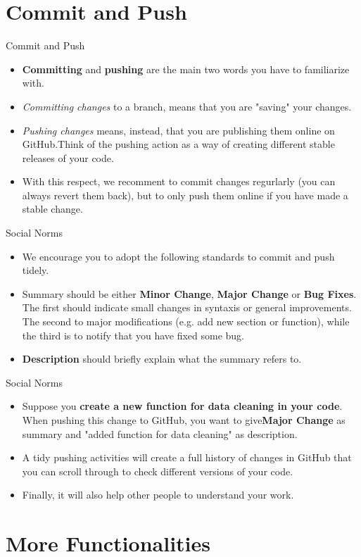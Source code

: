 \documentclass[aspectratio=169]{beamer}
\begin{document}
\section{Commit and Push}

\begin{frame}{Commit and Push}
	\begin{itemize}\setlength\itemsep{1.5em}
		\item \textbf{Committing} and \textbf{pushing} are the main two words you have to familiarize with.
		\item \emph{Committing changes} to a branch, means that you are "saving" your changes.
		\item \emph{Pushing changes} means, instead, that you are publishing them online on GitHub.Think of the pushing action as a way of creating different stable releases of your code.\item With this respect, we recomment to commit changes regurlarly (you can always revert them back), but to only push them online if you have made a stable change. 
	\end{itemize}
\end{frame}

\begin{frame}{Social Norms}
	\begin{itemize}\setlength\itemsep{2.5em}
		\item We encourage you to adopt the following standards to commit and push tidely.
		\item Summary should be either\textbf{ Minor Change}, \textbf{Major Change} or \textbf{Bug Fixes}. The first should indicate small changes in syntaxis or general improvements. The second to major modifications (e.g. add new section or function), while the third is to notify that you have fixed some bug.
		\item \textbf{Description} should briefly explain what the summary refers to.
	\end{itemize}
\end{frame}

\begin{frame}{Social Norms}
	\begin{itemize}\setlength\itemsep{2.5em}
		\item Suppose you \textbf{create a new function for data cleaning in your code}. When pushing this change to GitHub, you want to give\textbf{Major Change} as summary and "added function for data cleaning" as description.
		\item A tidy pushing activities will create a full history of changes in GitHub that you can scroll through to check different versions of your code.
		\item Finally, it will also help other people to understand your work.
	\end{itemize}
\end{frame}

\section{More Functionalities}
\end{document}
